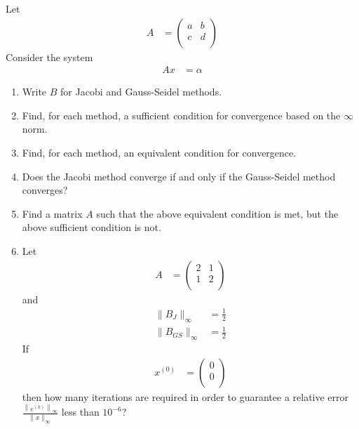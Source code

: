 \documentclass[fleqn, a4paper, 12pt, twoside]{article}
\theoremstyle{definition}
\theoremstyle{theorem}
\begin{document}
\begin{question}
	Let
	\begin{align*}
		A &=
			\begin{pmatrix}
				a & b \\
				c & d \\
			\end{pmatrix}
	\end{align*}
	Consider the system
	\begin{align*}
		A x & = \alpha
	\end{align*}
	\begin{enumerate}
		\item
			Write $B$ for Jacobi and Gauss-Seidel methods.
		\item
			Find, for each method, a sufficient condition for convergence based on the $\infty$ norm.
		\item
			Find, for each method, an equivalent condition for convergence.
		\item
			Does the Jacobi method converge if and only if the Gauss-Seidel method converges?
		\item
			Find a matrix $A$ such that the above equivalent condition is met, but the above sufficient condition is not.
		\item
			Let
			\begin{align*}
				A &=
					\begin{pmatrix}
						2 & 1 \\
						1 & 2 \\
					\end{pmatrix}
			\end{align*}
			and
			\begin{align*}
				\|B_J\|_{\infty}    & = \frac{1}{2} \\
				\|B_{GS}\|_{\infty} & = \frac{1}{2}
			\end{align*}
			If
			\begin{align*}
				x^{(0)} &=
					\begin{pmatrix}
						0 \\
						0 \\
					\end{pmatrix}
			\end{align*}
			then how many iterations are required in order to guarantee a relative error $\frac{\left\| e^{(k)} \right\|_{\infty}}{\|x\|_{\infty}}$ less than $10^{-6}$?
	\end{enumerate}
\end{question}
\end{document}
